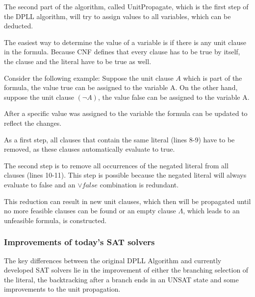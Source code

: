 The second part of the algorithm, called UnitPropagate, which is the first step of the DPLL algorithm, will try to assign values to all variables, which can be deducted.

The easiest way to determine the value of a variable is if there is any unit clause in the formula. Because CNF defines that every clause has to be true by itself, the clause and the literal have to be true as well.

Consider the following example: Suppose the unit clause $A$ which is part of the formula, the value true can be assigned to the variable A. On the other hand, suppose the unit clause $(\lnot A)$, the value false can be assigned to the variable A.

After a specific value was assigned to the variable the formula can be updated to reflect the changes. 

As a first step, all clauses that contain the same literal (lines 8-9) have to be removed, as these clauses automatically evaluate to true. 

The second step is to remove all occurrences of the negated literal from all clauses (lines 10-11). This step is possible because the negated literal will always evaluate to false and an $\lor false$ combination is redundant.

This reduction can result in new unit clauses, which then will be propagated until no more feasible clauses can be found or an empty clause $\Lambda$, which leads to an unfeasible formula, is constructed.

\subsubsection{Improvements of today's SAT solvers}
The key differences between the original DPLL Algorithm and currently developed SAT solvers lie in the improvement of either the branching selection of the literal, the backtracking after a branch ends in an UNSAT state and some improvements to the unit propagation.